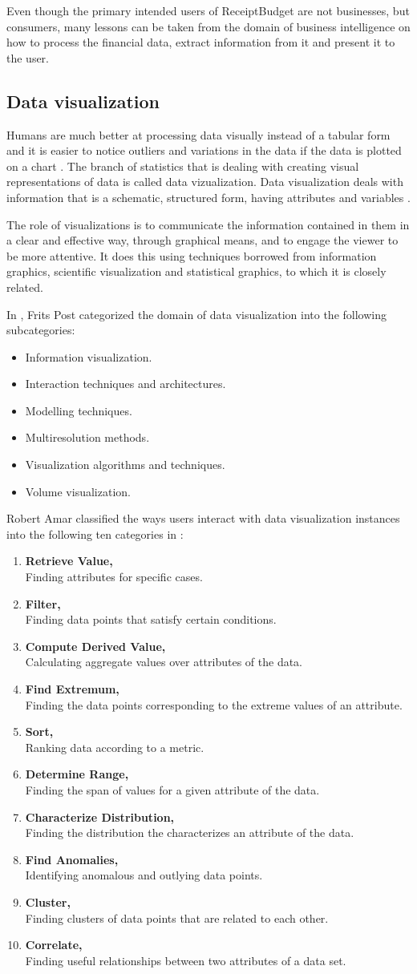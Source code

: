 Even though the primary intended users of ReceiptBudget are not businesses, but consumers, many lessons can be taken from the domain of business intelligence on how to process the financial data, extract information from it and present it to the user.  

\subsection{Data visualization}
Humans are much better at processing data visually instead of a tabular form and it is easier to notice outliers and variations in the data if the data is plotted on a chart  \cite{daniel1959use}. The branch of statistics that is dealing with creating visual representations of data is called data vizualization. Data visualization deals with information that is a schematic, structured form, having attributes and variables  \cite{friendly2008milestones}. 

The role of visualizations is to communicate the information contained in them in a clear and effective way, through graphical means, and to engage the viewer to be more attentive. It does this using techniques borrowed from information graphics, scientific visualization and statistical graphics, to which it is closely related. 

In \cite{post2003data}, Frits Post categorized the domain of data visualization into the following subcategories:

\begin{itemize}
	\item Information visualization.
	\item Interaction techniques and architectures.
	\item Modelling techniques.
	\item Multiresolution methods.
	\item Visualization algorithms and techniques.
	\item Volume visualization.
\end{itemize} 


Robert Amar classified the ways users interact with data visualization instances into the following ten categories in \cite{amar2005low}:

\newcommand\litem[1]{\item{\bfseries #1,\\}}
\begin{enumerate}
\litem{Retrieve Value} Finding attributes for specific cases.
\litem{Filter} Finding data points that satisfy certain conditions.
\litem{Compute Derived Value} Calculating aggregate values over attributes of the data.
\litem{Find Extremum} Finding the data points corresponding to the extreme values of an attribute.
\litem{Sort} Ranking data according to a metric.
\litem{Determine Range} Finding the span of values for a given attribute of the data.
\litem{Characterize Distribution} Finding the distribution the characterizes an attribute of the data.
\litem{Find Anomalies} Identifying anomalous and outlying data points.
\litem{Cluster} Finding clusters of data points that are related to each other.
\litem{Correlate} Finding useful relationships between two attributes of a data set.
\end{enumerate}

